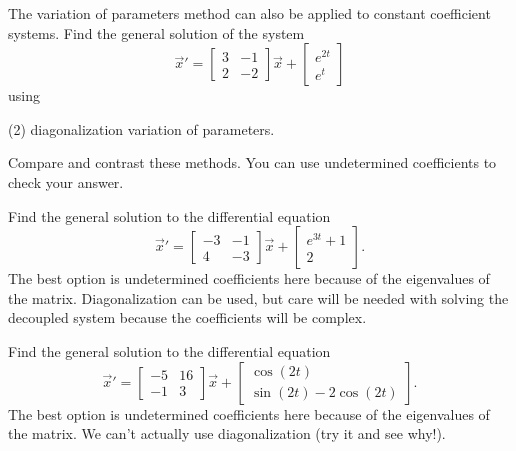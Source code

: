 \begin{exercise}
The variation of parameters method can also be applied to constant coefficient systems. Find the general solution of the system
\[ {\vec{x}}' = \begin{bmatrix} 3 & -1 \\ 2 & -2 \end{bmatrix} \vec{x} + \begin{bmatrix} e^{2t} \\ e^t \end{bmatrix} \] using 
\begin{tasks}(2)
\task diagonalization
\task variation of parameters.
\end{tasks}
Compare and contrast these methods. You can use undetermined coefficients to check your answer.
\end{exercise}

\begin{exercise}
Find the general solution to the differential equation
\begin{equation*}
{\vec{x}}' = \begin{bmatrix} -3 & -1 \\ 4 & -3 \end{bmatrix} \vec{x} + \begin{bmatrix} e^{3t} + 1 \\ 2 \end{bmatrix}. 
\end{equation*}
The best option is undetermined coefficients here because of the eigenvalues of the matrix. Diagonalization can be used, but care will be needed with solving the decoupled system because the coefficients will be complex. 
\end{exercise}

\begin{exercise}
Find the general solution to the differential equation
\begin{equation*}
{\vec{x}}' = \begin{bmatrix} -5 & 16 \\ -1 & 3 \end{bmatrix} \vec{x} + \begin{bmatrix} \cos(2t) \\ \sin(2t) - 2\cos(2t) \end{bmatrix}. 
\end{equation*}
The best option is undetermined coefficients here because of the eigenvalues of the matrix. We can't actually use diagonalization (try it and see why!).
\end{exercise}

